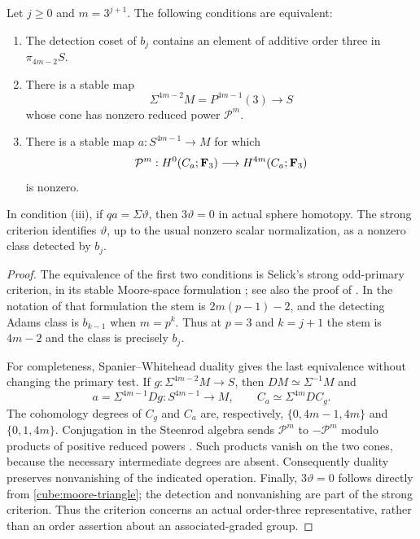 \begin{lemma}\label{cube:strong-criterion}
Let \(j\geq0\) and \(m=3^{j+1}\).  The following conditions are equivalent:
\begin{enumerate}[label=\textup{(\roman*)}]
\item The detection coset of \(b_j\) contains an element of additive order
three in \(\pi_{4m-2}S\).
\item There is a stable map
\[
 \Sigma^{4m-2}M=P^{4m-1}(3)\longrightarrow S
\]
whose cone has nonzero reduced power \(\mathcal P^m\).
\item There is a stable map \(a:S^{4m-1}\to M\) for which
\[
 \mathcal P^m:H^0(C_a;\mathbf F_3)\longrightarrow H^{4m}(C_a;\mathbf F_3)
\]
is nonzero.
\end{enumerate}
In condition \textup{(iii)}, if \(qa=\Sigma\vartheta\), then
\(3\vartheta=0\) in actual sphere homotopy.  The strong criterion identifies
\(\vartheta\), up to the usual nonzero scalar normalization, as a nonzero
class detected by \(b_j\).
\end{lemma}

\begin{proof}
The equivalence of the first two conditions is Selick's strong
odd-primary criterion, in its stable Moore-space formulation
\cite[Theorems~1.1 and~3.3]{Selick}; see also the proof of
\cite[Theorem~1.1]{Amelotte}.  In the notation of that formulation the
stem is \(2m(p-1)-2\), and the detecting Adams class is \(b_{k-1}\) when
\(m=p^k\).  Thus at \(p=3\) and \(k=j+1\) the stem is \(4m-2\) and the
class is precisely \(b_j\).

For completeness, Spanier--Whitehead duality gives the last equivalence
without changing the primary test.  If
\(g:\Sigma^{4m-2}M\to S\), then \(DM\simeq\Sigma^{-1}M\) and
\[
 a=\Sigma^{4m-1}Dg:S^{4m-1}\longrightarrow M,\qquad
 C_a\simeq\Sigma^{4m}DC_g.
\]
The cohomology degrees of \(C_g\) and \(C_a\) are, respectively,
\(\{0,4m-1,4m\}\) and \(\{0,1,4m\}\).  Conjugation in the Steenrod
algebra sends \(\mathcal P^m\) to \(-\mathcal P^m\) modulo products of
positive reduced powers
\cite[Section~7, pp.~166--167]{Milnor}.  Such products vanish on the two cones,
because the necessary intermediate degrees are absent.  Consequently
duality preserves nonvanishing of the indicated operation.
Finally, \(3\vartheta=0\) follows directly from
\eqref{cube:moore-triangle}; the detection and nonvanishing are part of
the strong criterion.  Thus the criterion concerns an actual
order-three representative, rather than an order assertion about an
associated-graded group.
\end{proof}


